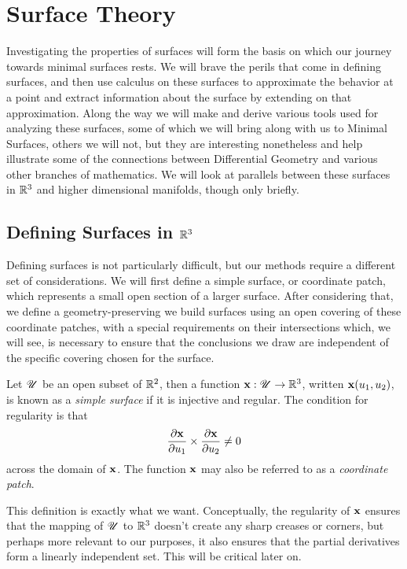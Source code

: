 \section{Surface Theory}

Investigating the properties of surfaces will form the basis on which our journey towards minimal surfaces rests. We will brave the perils that come in defining surfaces, and then use calculus on these surfaces to approximate the behavior at a point and extract information about the surface by extending on that approximation. Along the way we will make and derive various tools used for analyzing these surfaces, some of which we will bring along with us to Minimal Surfaces, others we will not, but they are interesting nonetheless and help illustrate some of the connections between Differential Geometry and various other branches of mathematics. We will look at parallels between these surfaces in $\mathbb{R}^3$ and higher dimensional manifolds, though only briefly.

\subsection{Defining Surfaces in $\mathbb{R}^3$}

Defining surfaces is not particularly difficult, but our methods require a different set of considerations. We will first define a simple surface, or coordinate patch, which represents a small open section of a larger surface. After considering that, we define a geometry-preserving we build surfaces using an open covering of these coordinate patches, with a special requirements on their intersections which, we will see, is necessary to ensure that the conclusions we draw are independent of the specific covering chosen for the surface.

\begin{defn}
  Let $\mathscr{U}$ be an open subset of $\mathbb{R}^2$, then a function $\mathbf{x}: \mathscr{U} \to \mathbb{R}^3$, written $\mathbf{x}(u_1, u_2)$, is known as a \emph{simple surface} if it is injective and regular. The condition for regularity is that
  \[
    \frac{\partial\mathbf{x}}{\partial u_1} \times \frac{\partial\mathbf{x}}{\partial u_2} \neq 0
  \]
  across the domain of $\mathbf{x}$. The function $\mathbf{x}$ may also be referred to as a \emph{coordinate patch}.
\end{defn}

This definition is exactly what we want. Conceptually, the regularity of $\mathbf{x}$ ensures that the mapping of $\mathscr{U}$ to $\mathbb{R}^3$ doesn't create any sharp creases or corners, but perhaps more relevant to our purposes, it also ensures that the partial derivatives form a linearly independent set. This will be critical later on.

